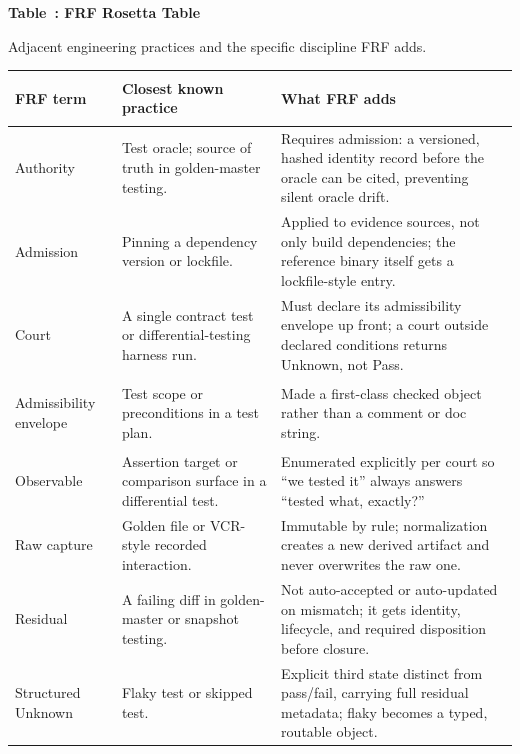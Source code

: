 \documentclass[11pt,a4paper]{article}
\newcommand{\frf}{\textsc{FRF}}
\begin{document}
\clearpage
{}
\thispagestyle{empty}
\begin{center}
\label{tab:frf-rosetta}
\Large\textbf{Table~\thetable: FRF Rosetta Table}

\vspace{0.25em}
\normalsize Adjacent engineering practices and the specific discipline \frf{} adds.

\vspace{0.9em}
\begingroup
\footnotesize
\setlength{\tabcolsep}{5pt}
\renewcommand{\arraystretch}{1.12}
\begin{tabularx}{\textwidth}{@{}>{\bfseries\raggedright\arraybackslash}p{}>{\raggedright\arraybackslash}p{}>{\raggedright\arraybackslash}X@{}}
\toprule
\rowcolor{black!8}
\textbf{FRF term} & \textbf{Closest known practice} & \textbf{What FRF adds} \\
\midrule
Authority & Test oracle; source of truth in golden-master testing. & Requires admission: a versioned, hashed identity record before the oracle can be cited, preventing silent oracle drift. \\
Admission & Pinning a dependency version or lockfile. & Applied to evidence sources, not only build dependencies; the reference binary itself gets a lockfile-style entry. \\
Court & A single contract test or differential-testing harness run. & Must declare its admissibility envelope up front; a court outside declared conditions returns Unknown, not Pass. \\
Admissibility envelope & Test scope or preconditions in a test plan. & Made a first-class checked object rather than a comment or doc string. \\
Observable & Assertion target or comparison surface in a differential test. & Enumerated explicitly per court so ``we tested it'' always answers ``tested what, exactly?'' \\
Raw capture & Golden file or VCR-style recorded interaction. & Immutable by rule; normalization creates a new derived artifact and never overwrites the raw one. \\
Residual & A failing diff in golden-master or snapshot testing. & Not auto-accepted or auto-updated on mismatch; it gets identity, lifecycle, and required disposition before closure. \\
Structured Unknown & Flaky test or skipped test. & Explicit third state distinct from pass/fail, carrying full residual metadata; flaky becomes a typed, routable object. \\

\end{tabularx}
\end{center}
\end{document}

